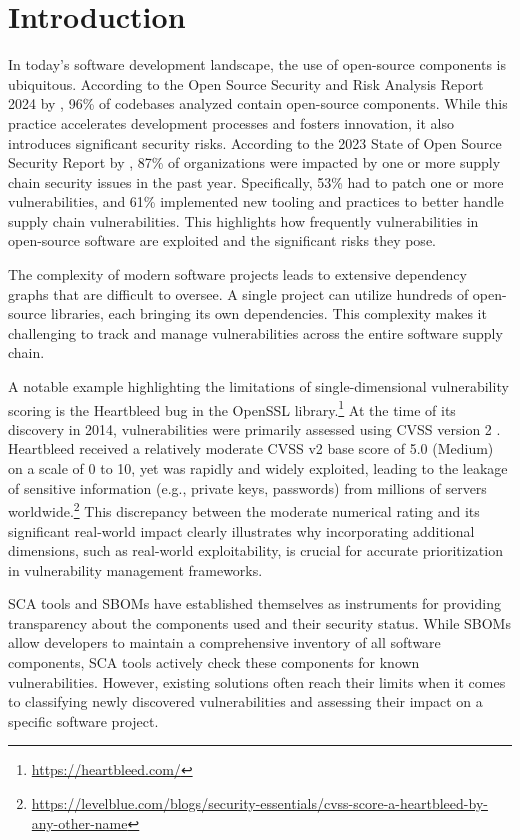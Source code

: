 \chapter{Introduction}
\label{chapter:introduction}

In today's software development landscape, the use of open-source components is ubiquitous. According to the Open Source Security and Risk Analysis Report 2024 by \textcite{black_duck_software_inc_open_2024}, 96\% of codebases analyzed contain open-source components. While this practice accelerates development processes and fosters innovation, it also introduces significant security risks. According to the 2023 State of Open Source Security Report by \textcite{snyk_limited_2023_2023}, 87\% of organizations were impacted by one or more supply chain security issues in the past year. Specifically, 53\% had to patch one or more vulnerabilities, and 61\% implemented new tooling and practices to better handle supply chain vulnerabilities. This highlights how frequently vulnerabilities in open-source software are exploited and the significant risks they pose.

The complexity of modern software projects leads to extensive dependency graphs that are difficult to oversee. A single project can utilize hundreds of open-source libraries, each bringing its own dependencies. This complexity makes it challenging to track and manage vulnerabilities across the entire software supply chain.

A notable example highlighting the limitations of single-dimensional vulnerability scoring is the Heartbleed bug in the OpenSSL library.\footnote{\url{https://heartbleed.com/}} At the time of its discovery in 2014, vulnerabilities were primarily assessed using \ac{CVSS} version 2 \autocite{balbix_inc_cvss_2020}. Heartbleed received a relatively moderate \ac{CVSS} v2 base score of 5.0 (Medium) on a scale of 0 to 10, yet was rapidly and widely exploited, leading to the leakage of sensitive information (e.g., private keys, passwords) from millions of servers worldwide.\footnote{\url{https://levelblue.com/blogs/security-essentials/cvss-score-a-heartbleed-by-any-other-name}} This discrepancy between the moderate numerical rating and its significant real-world impact clearly illustrates why incorporating additional dimensions, such as real-world exploitability, is crucial for accurate prioritization in vulnerability management frameworks.

\ac{SCA} tools and \ac{SBOM}s have established themselves as instruments for providing transparency about the components used and their security status. While \ac{SBOM}s allow developers to maintain a comprehensive inventory of all software components, \ac{SCA} tools actively check these components for known vulnerabilities. However, existing solutions often reach their limits when it comes to classifying newly discovered vulnerabilities and assessing their impact on a specific software project.

